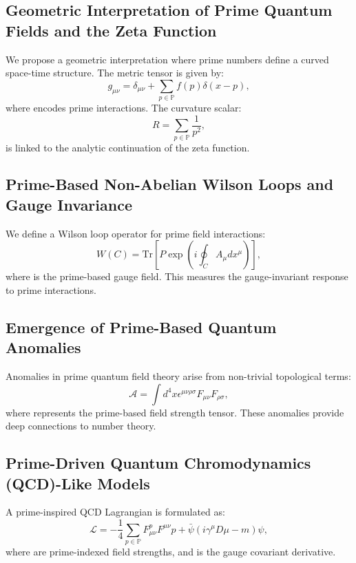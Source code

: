 \documentclass{article}
\theoremstyle{plain}
\theoremstyle{plain}
\theoremstyle{definition}
\theoremstyle{remark}
\begin{document}
\subsection{Geometric Interpretation of Prime Quantum Fields and the Zeta Function}
We propose a geometric interpretation where prime numbers define a curved space-time structure. The metric tensor is given by:
\begin{equation}
g_{\mu\nu} = \delta_{\mu\nu} + \sum_{p \in \mathbb{P}} f(p) \delta(x - p),
\end{equation}
where  encodes prime interactions. The curvature scalar:
\begin{equation}
R = \sum_{p \in \mathbb{P}} \frac{1}{p^2},
\end{equation}
is linked to the analytic continuation of the zeta function.

\subsection{Prime-Based Non-Abelian Wilson Loops and Gauge Invariance}
We define a Wilson loop operator for prime field interactions:
\begin{equation}
W(C) = \text{Tr} \left[ P \exp \left( i \oint_C A_{\mu} dx^{\mu} \right) \right],
\end{equation}
where  is the prime-based gauge field. This measures the gauge-invariant response to prime interactions.

\subsection{Emergence of Prime-Based Quantum Anomalies}
Anomalies in prime quantum field theory arise from non-trivial topological terms:
\begin{equation}
\mathcal{A} = \int d^4x \epsilon^{\mu\nu\rho\sigma} F_{\mu\nu} F_{\rho\sigma},
\end{equation}
where  represents the prime-based field strength tensor. These anomalies provide deep connections to number theory.

\subsection{Prime-Driven Quantum Chromodynamics (QCD)-Like Models}
A prime-inspired QCD Lagrangian is formulated as:
\begin{equation}
\mathcal{L} = -\frac{1}{4} \sum_{p \in \mathbb{P}} F_{\mu\nu}^p F^{\mu\nu}p + \bar{\psi} (i \gamma^{\mu} D{\mu} - m) \psi,
\end{equation}
where  are prime-indexed field strengths, and  is the gauge covariant derivative.
\end{document}
